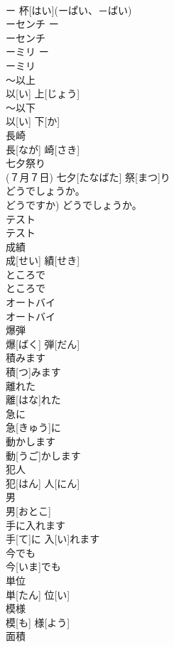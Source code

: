 \documentclass[8pt]{extreport}
\begin{document}
\begin{CJK}{UTF8}{min}
\\	ー 杯[はい](ーぱい、－ばい)		
\\	ーセンチ	ー 
\\	ーセンチ		
\\	ーミリ	ー 
\\	ーミリ		
\\	～以上	
\\	以[い] 上[じょう]		
\\	～以下	
\\	以[い] 下[か]		
\\	長崎	
\\	長[なが] 崎[さき]		
\\	七夕祭り	
\\	(７月７日)	七夕[たなばた] 祭[まつ]り		
\\	どうでしょうか。	
\\	どうですか)	どうでしょうか。		
\\	テスト	
\\	テスト		
\\	成績	
\\	成[せい] 績[せき]		
\\	ところで	
\\	ところで		
\\	オートバイ	
\\	オートバイ		
\\	爆弾	
\\	爆[ばく] 弾[だん]		
\\	積みます	
\\	積[つ]みます		
\\	離れた	
\\	離[はな]れた		
\\	急に	
\\	急[きゅう]に		
\\	動かします	
\\	動[うご]かします		
\\	犯人	
\\	犯[はん] 人[にん]		
\\	男	
\\	男[おとこ]		
\\	手に入れます	
\\	手[て]に 入[い]れます		
\\	今でも	
\\	今[いま]でも		
\\	単位	
\\	単[たん] 位[い]		
\\	模様	
\\	模[も] 様[よう]		
\\	面積	

\end{CJK}
\end{document}
